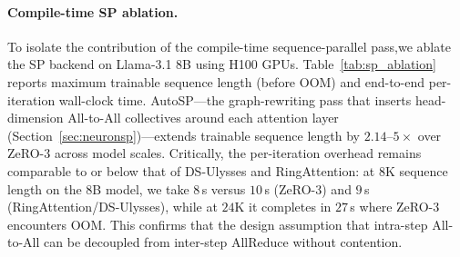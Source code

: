 \documentclass{article}
\begin{document}
\paragraph{Compile-time SP ablation.} \begin{table}
\vspace{-6pt}
\centering
\scriptsize
\setlength{\tabcolsep}{4.5pt}
\renewcommand{\arraystretch}{1.12}
\caption{Compile-time SP ablation on Llama-3.1 using H100 GPUs. Left: maximum trainable sequence length before OOM. Right: per-iteration time for the 8B model.}
\label{tab:sp_ablation}
\vspace{-8pt}
\end{table}
To isolate the contribution of the compile-time sequence-parallel pass,we ablate the SP backend
on Llama-3.1 8B using H100 GPUs.
Table~\ref{tab:sp_ablation} reports maximum trainable sequence length (before OOM) and
end-to-end per-iteration wall-clock time.
AutoSP---the graph-rewriting pass that inserts head-dimension All-to-All collectives around
each attention layer (Section~\ref{sec:neuronsp})---extends trainable sequence length by
$2.14$--$5{\times}$ over ZeRO-3 across model scales.
Critically, the per-iteration overhead remains comparable to or below that of DS-Ulysses and
RingAttention: at $8$K sequence length on the 8B model, we take $8$\,s versus $10$\,s (ZeRO-3)
and $9$\,s (RingAttention/DS-Ulysses), while at $24$K it completes in $27$\,s where ZeRO-3 encounters OOM.
This confirms that the design
assumption that intra-step All-to-All can be decoupled from inter-step AllReduce
without contention.



\end{document}
